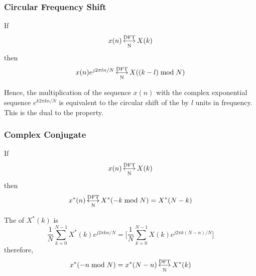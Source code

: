 \subsubsection{Circular Frequency Shift}\label{subsubsec:DFT_Properties-Circular_Frequency_Shift}
If
\begin{equation*}
  x(n) \operatorname{\overset{\text{DFT}}{\underset{N}{\longleftrightarrow}}} X(k)
\end{equation*}
then
\begin{equation}\label{eq:DFT_Properties-Circular_Frequency_Shift}
  x(n)e^{j 2\pi l n/N} \operatorname{\overset{\text{DFT}}{\underset{N}{\longleftrightarrow}}} X((k-l) \bmod N)
\end{equation}

Hence, the multiplication of the sequence $x(n)$ with the complex exponential sequence $e^{k 2\pi k n/N}$ is equivalent to the circular shift of the  by $l$ units in frequency.
This is the dual to the  property.

\subsubsection{Complex Conjugate}\label{subsubsec:DFT_Properties-Complex_Conjugate}
If
\begin{equation*}
  x(n) \operatorname{\overset{\text{DFT}}{\underset{N}{\longleftrightarrow}}} X(k)
\end{equation*}
then
\begin{equation}\label{eq:DFT_Properties-Complex_Conjugate}
  x^{*}(n) \operatorname{\overset{\text{DFT}}{\underset{N}{\longleftrightarrow}}} X^{*}(-k \bmod N) = X^{*}(N-k)
\end{equation}

The  of $X^{*}(k)$ is
\begin{equation*}
  \frac{1}{N} \sum\limits_{k=0}^{N-1} X^{*}(k)e^{j 2\pi k n/N} = \Biggl[ \frac{1}{N} \sum\limits_{k=0}^{N-1} X(k) e^{j 2\pi k (N-n)/N} \Biggr]
\end{equation*}
therefore,
\begin{equation}\label{eq:DFT_Properties-IDFT_Complex_Conjugate}
  x^{*}(-n \bmod N) = x^{*}(N-n) \operatorname{\overset{\text{DFT}}{\underset{N}{\longleftrightarrow}}} X^{*}(k)
\end{equation}

